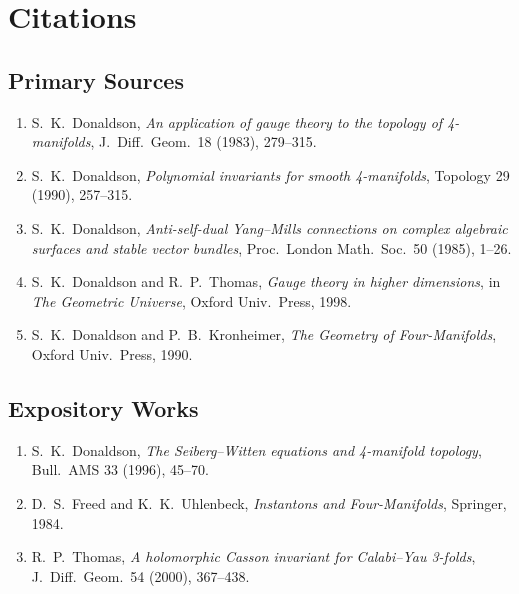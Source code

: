 \section{Citations}\subsection*{Primary Sources}
\begin{enumerate}
    \item S.\ K.\ Donaldson, \textit{An application of gauge theory to the topology of 4-manifolds}, J.\ Diff.\ Geom.\ 18 (1983), 279--315.
    \item S.\ K.\ Donaldson, \textit{Polynomial invariants for smooth 4-manifolds}, Topology 29 (1990), 257--315.
    \item S.\ K.\ Donaldson, \textit{Anti-self-dual Yang--Mills connections on complex algebraic surfaces and stable vector bundles}, Proc.\ London Math.\ Soc.\ 50 (1985), 1--26.
    \item S.\ K.\ Donaldson and R.\ P.\ Thomas, \textit{Gauge theory in higher dimensions}, in \textit{The Geometric Universe}, Oxford Univ.\ Press, 1998.
    \item S.\ K.\ Donaldson and P.\ B.\ Kronheimer, \textit{The Geometry of Four-Manifolds}, Oxford Univ.\ Press, 1990.
\end{enumerate}

\subsection*{Expository Works}
\begin{enumerate}
    \item S.\ K.\ Donaldson, \textit{The Seiberg--Witten equations and 4-manifold topology}, Bull.\ AMS 33 (1996), 45--70.
    \item D.\ S.\ Freed and K.\ K.\ Uhlenbeck, \textit{Instantons and Four-Manifolds}, Springer, 1984.
    \item R.\ P.\ Thomas, \textit{A holomorphic Casson invariant for Calabi--Yau 3-folds}, J.\ Diff.\ Geom.\ 54 (2000), 367--438.
\end{enumerate}

